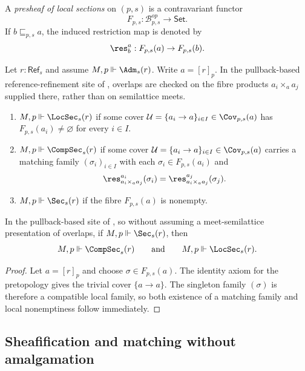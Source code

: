 \begin{definition}\label{def:local-object-functor}
A \emph{presheaf of local sections} on $(p,s)$ is a contravariant functor
\[
F_{p,s}:\mathcal{B}_{p,s}^{op}\to\mathsf{Set}.
\]
If $b\sqsubseteq_{p,s} a$, the induced restriction map is denoted by
\[
\res_b^a:F_{p,s}(a)\to F_{p,s}(b).
\]
\end{definition}

\begin{definition}\label{def:existence-levels}
Let $r:\mathsf{Ref}_s$ and assume $M,p\Vdash \Adm_s(r)$. Write $a=[r]_p$.
In the pullback-based reference-refinement site of , overlaps are checked on the fibre products $a_i\times_a a_j$ supplied there, rather than on semilattice meets.
\begin{enumerate}[label=(\roman*),nosep]
\item $M,p\Vdash \LocSec_s(r)$ if some cover $\mathcal U=\{a_i\to a\}_{i\in I}\in\Cov_{p,s}(a)$ has $F_{p,s}(a_i)\neq\varnothing$ for every $i\in I$.
\item $M,p\Vdash \CompSec_s(r)$ if some cover $\mathcal U=\{a_i\to a\}_{i\in I}\in\Cov_{p,s}(a)$ carries a matching family $(\sigma_i)_{i\in I}$ with each $\sigma_i\in F_{p,s}(a_i)$ and
\[
\res_{a_i\times_a a_j}^{a_i}(\sigma_i)=\res_{a_i\times_a a_j}^{a_j}(\sigma_j).
\]
\item $M,p\Vdash \Sec_s(r)$ if the fibre $F_{p,s}(a)$ is nonempty.
\end{enumerate}
\end{definition}

\begin{proposition}\label{prop:global-implies-compatible-local}
In the pullback-based site of , so without assuming a meet-semilattice presentation of overlaps, if $M,p\Vdash \Sec_s(r)$, then
\[
M,p\Vdash \CompSec_s(r)
\qquad\text{and}\qquad
M,p\Vdash \LocSec_s(r).
\]
\end{proposition}

\begin{proof}
Let $a=[r]_p$ and choose $\sigma\in F_{p,s}(a)$. The identity axiom for the pretopology gives the trivial cover $\{a\to a\}$. The singleton family $(\sigma)$ is therefore a compatible local family, so both existence of a matching family and local nonemptiness follow immediately.
\end{proof}

\subsection{Sheafification and matching without amalgamation}

